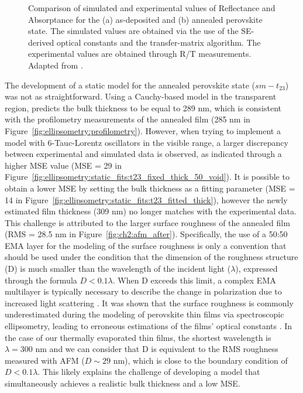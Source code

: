 \begin{figure}[htbp]
    \caption[Comparison of simulated and experimental values of Reflectance and Absorptance for the as-deposited and annealed perovskite state.]{Comparison of simulated and experimental values of Reflectance and Absorptance for the (a) as-deposited and (b) annealed perovskite state. The simulated values are obtained via the use of the SE-derived optical constants and the transfer-matrix algorithm. The experimental values are obtained through R/T measurements. Adapted from \cite{Papadopoulou2024InEllipsometry}.}
    \label{fig:ellipsometry:RT}
\end{figure}

 
The development of a static model for the annealed perovskite state ($sm-t_{\text{23}}$) was not as straightforward. Using a Cauchy-based model in the transparent region, predicts the bulk thickness to be equal to 289 nm, which is consistent with the profilometry measurements of the annealed film (285 nm in Figure~\ref{fig:ellipsometry:profilometry}). However, when trying to implement a model with 6-Tauc-Lorentz oscillators in the visible range, a larger discrepancy between experimental and simulated data is observed, as indicated through a higher MSE value (MSE = 29 in Figure~\ref{fig:ellipsometry:static_fits:t23_fixed_thick_50_void}). It is possible to obtain a lower MSE by setting the bulk thickness as a fitting parameter (MSE = 14 in Figure~\ref{fig:ellipsometry:static_fits:t23_fitted_thick}), however the newly estimated film thickness (309 nm) no longer matches with the experimental data. This challenge is attributed to the larger surface roughness of the annealed film (RMS = 28.5 nm in Figure~\ref{fig:ch2:afm_after}). Specifically, the use of a 50:50 EMA layer for the modeling of the surface roughness is only a convention that should be used under the condition that the dimension of the roughness structure (D) is much smaller than the wavelength of the incident light ($\lambda$), expressed through the formula $D<0.1\lambda$. When D exceeds this limit, a complex EMA multilayer is typically necessary to describe the change in polarization due to increased light scattering \cite{Akagawa2011High-precisionEllipsometry}. It was shown that the surface roughness is commonly underestimated during the modeling of perovskite thin films via spectroscopic ellipsometry, leading to erroneous estimations of the films' optical constants \cite{Fujiwara2017DeterminationMaterials}. In the case of our thermally evaporated thin films, the shortest wavelength is $\lambda=300$ nm and we can consider that D is equivalent to the RMS roughness measured with AFM ($D \sim 29$ nm), which is close to the boundary condition of $D<0.1\lambda$. This likely explains the challenge of developing a model that simultaneously achieves a realistic bulk thickness and a low MSE. 



